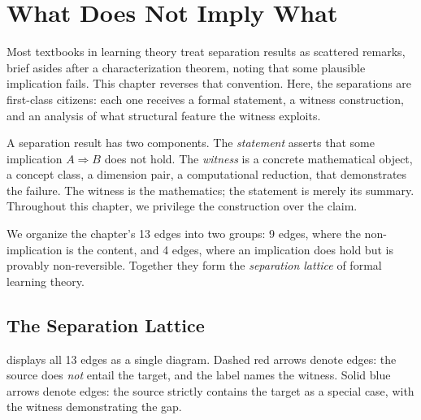 

\chapter{What Does Not Imply What}
\label{ch:separations}

Most textbooks in learning theory treat separation results as scattered
remarks, brief asides after a characterization theorem, noting that
some plausible implication fails. This chapter reverses that convention.
Here, the separations are first-class citizens: each one receives a
formal statement, a witness construction, and an analysis of what
structural feature the witness exploits.

A separation result has two components. The \emph{statement} asserts
that some implication $A \Rightarrow B$ does not hold. The
\emph{witness} is a concrete mathematical object, a concept class,
a dimension pair, a computational reduction, that demonstrates the
failure. The witness is the mathematics; the statement is merely its
summary. Throughout this chapter, we privilege the construction over the
claim.

We organize the chapter's 13 edges into two groups: 9
 edges, where the non-implication is the content,
and 4  edges, where an implication does hold but
is provably non-reversible. Together they form the \emph{separation
lattice} of formal learning theory.


\section{The Separation Lattice}
\label{sec:sep-lattice}

 displays all 13 edges as a single
diagram. Dashed red arrows denote  edges: the
source does \emph{not} entail the target, and the label names the
witness. Solid blue arrows denote  edges: the
source strictly contains the target as a special case, with the witness
demonstrating the gap.

